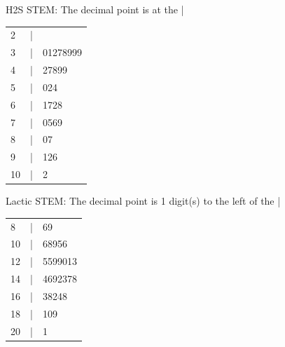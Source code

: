 \documentclass[12pt]{article}
\begin{document}
	H2S STEM: The decimal point is at the |\par
	\begin{tabular}{lcl}
		2 & | & \\
		3 & | & 01278999\\
		4 & | & 27899\\
		5 & | & 024\\
		6 & | & 1728\\
		7 & | & 0569\\
		8 & | & 07\\
		9 & | & 126\\
		10 & | & 2\\
	\end{tabular}\par
	
	Lactic STEM: The decimal point is 1 digit(s) to the left of the |\par
	\begin{tabular}{lcl}
		8 & | & 69\\
		10 & | & 68956\\
		12 & | & 5599013\\
		14 & | & 4692378\\
		16 & | & 38248\\
		18 & | & 109\\
		20 & | & 1\\
	\end{tabular}\par
	
\end{document}
